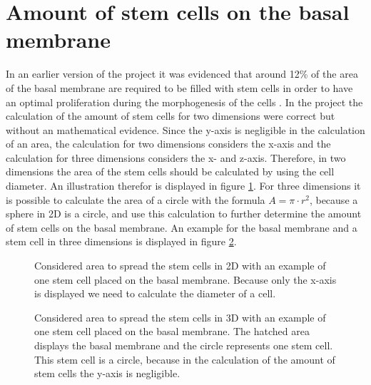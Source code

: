 \section{Amount of stem cells on the basal membrane}\label{sec:AmountStemCellsBasalMembrane}
In an earlier version of the project it was evidenced that around 12\% of the area of the basal membrane are required to be filled with stem cells in order to have an optimal proliferation during the morphogenesis of the cells \cite{Torelli2017}.
In the project the calculation of the amount of stem cells for two dimensions were correct but without an mathematical evidence. \newline
Since the y-axis is negligible in the calculation of an area, the calculation for two dimensions considers the x-axis and the calculation for three dimensions considers the x- and z-axis. Therefore, in two dimensions the area of the stem cells should be calculated by using the cell diameter. An illustration therefor is displayed in figure \ref{tikz:AreaIn2D}. For three dimensions it is possible to calculate the area of a circle with the formula $A = \pi \cdot r^{2}$, because a sphere in 2D is a circle, and use this calculation to further determine the amount of stem cells on the basal membrane. An example for the basal membrane and a stem cell in three dimensions is displayed in figure \ref{tikz:AreaIn3D}. 

\begin{figure}[h]
\begin{center}
\caption{Considered area to spread the stem cells in 2D with an example of one stem cell placed on the basal membrane. Because only the x-axis is displayed we need to calculate the diameter of a cell.}
\label{tikz:AreaIn2D}
\end{center}
\end{figure}


\begin{figure}[h]
\begin{center}
\caption{Considered area to spread the stem cells in 3D with an example of one stem cell placed on the basal membrane. The hatched area displays the basal membrane and the circle represents one stem cell. This stem cell is a circle, because in the calculation of the amount of stem cells the y-axis is negligible.}
\label{tikz:AreaIn3D}
\end{center}
\end{figure}


